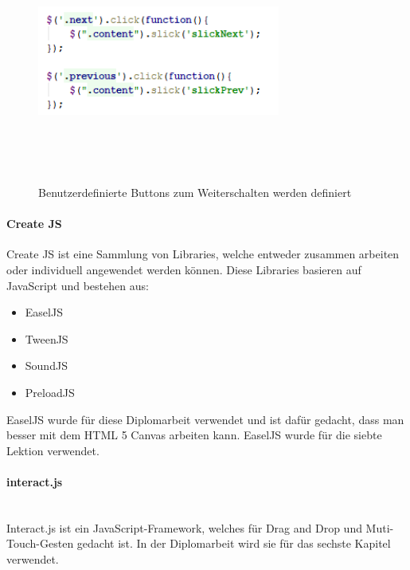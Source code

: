 \begin{figure}[H]
	\centering				\includegraphics[width=8cm,height=8cm,keepaspectratio]{webseite_abb2} 
	\caption{Benutzerdefinierte Buttons zum Weiterschalten werden definiert}
\end{figure}

\paragraph{Create JS} 
Create JS ist eine Sammlung von Libraries, welche entweder zusammen arbeiten oder individuell angewendet werden können. Diese Libraries basieren auf JavaScript und bestehen aus:
\begin{itemize}
\item EaselJS
\item TweenJS
\item SoundJS
\item PreloadJS
\end{itemize}
EaselJS wurde für diese Diplomarbeit verwendet und ist dafür gedacht, dass man besser mit dem HTML 5 Canvas arbeiten kann. EaselJS wurde für die siebte Lektion verwendet. 
\paragraph{interact.js} \leavevmode \\
Interact.js ist ein JavaScript-Framework, welches für Drag and Drop und Muti-Touch-Gesten gedacht ist. In der Diplomarbeit wird sie für das sechste Kapitel verwendet. 

